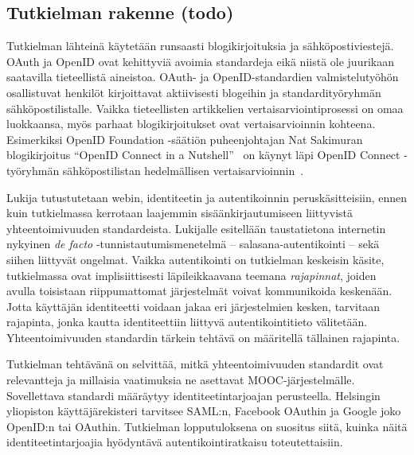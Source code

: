 \documentclass[finnish,gradu]{tktltiki}
\begin{document}


\subsection{Tutkielman rakenne (todo)} %
\label{sub:tutkielman_rakenne}

Tutkielman lähteinä käytetään runsaasti blogikirjoituksia ja sähköpostiviestejä. OAuth ja OpenID ovat kehittyviä avoimia standardeja eikä niistä ole juurikaan saatavilla tieteellistä aineistoa. OAuth- ja OpenID-standardien valmistelutyöhön osallistuvat henkilöt kirjoittavat aktiivisesti blogeihin ja standardityöryhmän sähköpostilistalle. Vaikka tieteellisten artikkelien vertaisarviointiprosessi on omaa luokkaansa, myös parhaat blogikirjoitukset ovat vertaisarvioinnin kohteena. Esimerkiksi OpenID Foundation -säätiön puheenjohtajan Nat Sakimuran blogikirjoitus ``OpenID Connect in a Nutshell''~\cite{sakimura_openid_c_nutshell_2012} on käynyt läpi OpenID Connect -työryhmän sähköpostilistan hedelmällisen vertaisarvioinnin~\cite{openid_c_nutshell_peer_review_1_2012, openid_c_nutshell_peer_review_2_2012}.

Lukija tutustutetaan webin, identiteetin ja autentikoinnin peruskäsitteisiin, ennen kuin tutkielmassa kerrotaan laajemmin sisäänkirjautumiseen liittyvistä yhteentoimivuuden standardeista. Lukijalle esitellään taustatietona internetin nykyinen \emph{de facto} -tunnistautumismenetelmä -- salasana-autentikointi -- sekä siihen liittyvät ongelmat. Vaikka autentikointi on tutkielman keskeisin käsite, tutkielmassa ovat implisiittisesti läpileikkaavana teemana \emph{rajapinnat}, joiden avulla toisistaan riippumattomat järjestelmät voivat kommunikoida keskenään. Jotta käyttäjän identiteetti voidaan jakaa eri järjestelmien kesken, tarvitaan rajapinta, jonka kautta identiteettiin liittyvä autentikointitieto välitetään. Yhteentoimivuuden standardin tärkein tehtävä on määritellä tällainen rajapinta.

Tutkielman tehtävänä on selvittää, mitkä yhteentoimivuuden standardit ovat relevantteja ja millaisia vaatimuksia ne asettavat MOOC-järjestelmälle. Sovellettava standardi määräytyy identiteetintarjoajan perusteella. Helsingin yliopiston käyttäjärekisteri tarvitsee SAML:n, Facebook OAuthin ja Google joko OpenID:n tai OAuthin. Tutkielman lopputuloksena on suositus siitä, kuinka näitä identiteetintarjoajia hyödyntävä autentikointiratkaisu toteutettaisiin.


\end{document}
